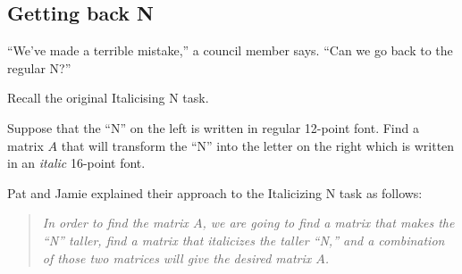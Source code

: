 \begin{iola}
\section*{Getting back N}
\question

``We've made a terrible mistake,'' a council member says. ``Can we go back to the regular N?''


Recall the original Italicising N task.
\begin{minipage}{.5\textwidth}
\hfill
{}\hfill
\end{minipage}
\begin{minipage}{.5\textwidth}

Suppose that the ``N'' on the left is written in regular 12-point font.  Find a matrix $A$ that will transform
	the ``N'' into the letter on the right which is written in an \emph{italic} 16-point font.
\end{minipage}

Pat and Jamie explained their approach to the Italicizing N task as follows:
\begin{quote}\itshape
	In order to find the matrix $A$, we are going to find a matrix that makes the ``N'' taller,
	find a matrix that italicizes the taller ``N,'' and a combination of those two matrices
	will give the desired matrix $A$.
\end{quote}



\end{iola}
